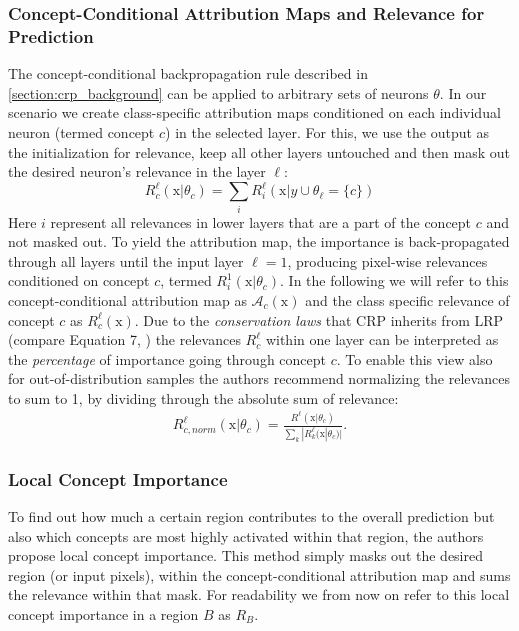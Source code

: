 \subsubsection{Concept-Conditional Attribution Maps and Relevance for Prediction}
The concept-conditional backpropagation rule described in \cref{section:crp_background} can be applied to arbitrary sets of neurons $\theta$. In our scenario we create class-specific attribution maps conditioned on each individual neuron (termed concept $c$) in the selected layer. For this, we use the output as the initialization for relevance, keep all other layers untouched and then mask out the desired neuron's relevance in the layer $\ell$: 
\begin{equation}
    R^{\ell}_{c}(\mathrm{x} |\theta_{c}) = \sum_{i} R_i^{\ell}(\mathrm{x} |y \cup \theta_{\ell} = \{c\})
\end{equation}
Here $i$ represent all relevances in lower layers that are a part of the concept $c$ and not masked out. 
To yield the attribution map, the importance is back-propagated through all layers until the input layer $\ell = 1$, producing pixel-wise relevances conditioned on concept $c$, termed $R_{i}^{1}(\mathrm{x} |\theta_{c})$. In the following we will refer to this concept-conditional attribution map as $\mathcal{A}_c(\mathrm{x})$ and the class specific relevance of concept $c$ as $R_c^{\ell}(\mathrm{x})$. Due to the \textit{conservation laws} that CRP inherits from LRP (compare Equation 7, \cite{Achtibat2022}) the relevances $R_c^{\ell}$ within one layer can be interpreted as the \textit{percentage} of importance going through concept $c$. To enable this view also for out-of-distribution samples the authors recommend normalizing the relevances to sum to 1, by dividing through the absolute sum of relevance:
\begin{align}\label{eq:normed_relevance}
    R^{\ell}_{c,norm}(\mathrm{x} |\theta_{c}) = \frac{R^{\ell}(\mathrm{x} |\theta_{c}) }{\sum_k |R_k^{\ell}(\mathrm{x} |\theta_{c})|}.
\end{align}

\subsubsection{Local Concept Importance}
To find out how much a certain region contributes to the overall prediction but also which concepts are most highly activated within that region, the authors propose local concept importance. 
This method simply masks out the desired region (or input pixels), within the concept-conditional attribution map and sums the relevance within that mask. 
For readability we from now on refer to this local concept importance in a region $B$ as $R_B$.

